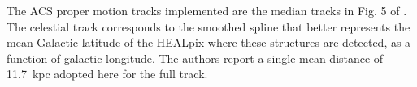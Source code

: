The ACS proper motion tracks implemented are the median tracks in Fig. 5 of \citet[][data provided by P. Ramos priv. comm.]{Ramos2021}. The celestial track corresponds to the smoothed spline that better represents the mean Galactic latitude of the HEALpix where these structures are detected, as a function of galactic longitude. The authors report a single mean distance of 11.7~kpc adopted here for the full track.


